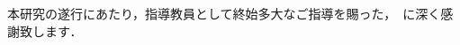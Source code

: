 \begin{acknowledgements}
	本研究の遂行にあたり，指導教員として終始多大なご指導を賜った，\makeatletter\tpu@supervisorname\ \tpu@supervisorrole\makeatother に深く感謝致します．
\end{acknowledgements}
